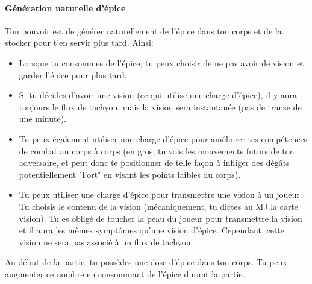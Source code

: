 {	\paragraph{Génération naturelle d'épice} Ton pouvoir est de générer naturellement de l'épice dans ton corps et de la stocker pour t'en servir plus tard. Ainsi:
	\begin{itemize}
		\item Lorsque tu consommes de l'épice, tu peux choisir de ne pas avoir de vision et garder l'épice pour plus tard.
		\item Si tu décides d'avoir une vision (ce qui utilise une charge d'épice), il y aura toujours le flux de tachyon, mais la vision sera instantanée (pas de transe de une minute).
		\item Tu peux également utiliser une charge d'épice pour améliorer tes compétences de combat au corps à corps (en gros, tu vois les mouvements futurs de ton adversaire, et peut donc te positionner de telle façon à infliger des dégâts potentiellement "Fort" en visant les points faibles du corps).
		\item Tu peux utiliser une charge d'épice pour transmettre une vision à un joueur. Tu choisis le contenu de la vision (mécaniquement, tu dictes au MJ la carte vision). Tu es obligé de toucher la peau du joueur pour transmettre la vision et il aura les mêmes symptômes qu'une vision d'épice. Cependant, cette vision ne sera pas associé à un flux de tachyon.
	\end{itemize}
	Au début de la partie, tu possèdes une dose d'épice dans ton corps. Tu peux augmenter ce nombre en consommant de l'épice durant la partie.
}



